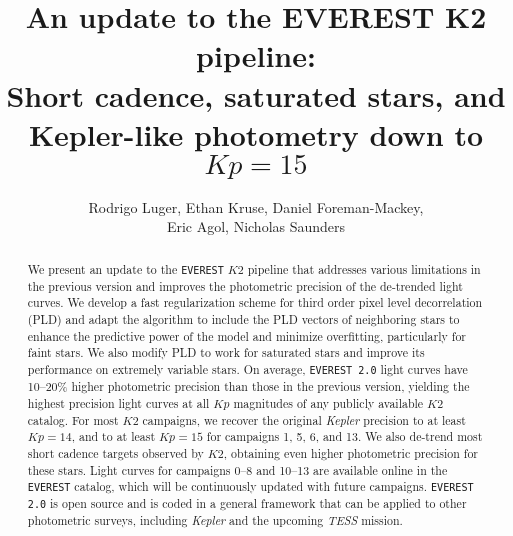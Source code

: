 \documentclass[]{emulateapj}
\newcommand{\Kp}{\ensuremath{Kp}}
\newcommand{\edited}[1]{{\color{red} #1}}
\begin{document}
\title{An update to the EVEREST K2 pipeline:\\ Short cadence, saturated stars, and Kepler-like photometry down to $\Kp = 15$}
\author{Rodrigo Luger, Ethan Kruse, Daniel Foreman-Mackey,\\
Eric Agol, Nicholas Saunders}

\begin{abstract}
We present an update to the \texttt{EVEREST} $K2$ pipeline that addresses various limitations
in the previous version and improves the photometric precision of the de-trended light curves.
We develop a fast regularization scheme for third order pixel level decorrelation (PLD) and
adapt the algorithm to include the PLD vectors of neighboring stars to enhance the predictive
power of the model and minimize overfitting, particularly for faint stars. We also modify PLD to work for saturated
stars and improve its performance on extremely variable stars. On average, \texttt{EVEREST 2.0}
light curves have 10--20\% higher photometric precision than those in the previous version,
yielding the highest precision light curves at all $\Kp$ magnitudes of any publicly available $K2$
catalog. For most $K2$ campaigns, we recover the original \emph{Kepler} precision to at least
$\Kp = 14$, and to at least $\Kp = 15$ for campaigns 1, 5, 6, \edited{and 13}. We also de-trend \edited{most} short
cadence targets observed by $K2$, obtaining even higher photometric precision for these stars.
Light curves for campaigns 0--8 \edited{and 10--13} are available online in the \texttt{EVEREST} catalog, which
will be continuously updated with future campaigns.
\texttt{EVEREST 2.0} is open source and is coded in a general framework that can be applied
to other photometric surveys, including \emph{Kepler} and the upcoming \emph{TESS} mission.\\
\end{abstract}

\end{document}
